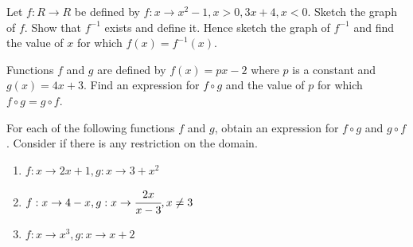 \documentclass[letterpaper]{article}
\begin{document}
\begin{enumerate}
\begin{enumerate}
Let $f: R \to R$ be defined by $f: x \to x^2 - 1, x \gt 0, 3x + 4, x < 0$. Sketch the graph of $f$. Show that $f^{-1}$ exists and define it. Hence sketch the graph of $f^{-1}$ and find the value of $x$ for which $f(x) = f^{-1}(x)$.

Functions $f$ and $g$ are defined by $f(x) = px - 2$ where $p$ is a constant and $g(x) = 4x + 3$. Find an expression for $f \circ g$ and the value of $p$ for which $f \circ g = g \circ f$.

For each of the following functions $f$ and $g$, obtain an expression for $f \circ g$ and $g \circ f$. Consider if there is any restriction on the domain.

\begin{enumerate}
\item $f: x \to 2x + 1, g: x \to 3 + x^2$
\item $f: x \to 4 - x, g: x \to \cfrac{2x}{x - 3}, x \ne 3$
\item $f: x \to x^3, g: x \to x + 2$
\end{enumerate}



\end{enumerate}


\end{enumerate}
\end{document}
